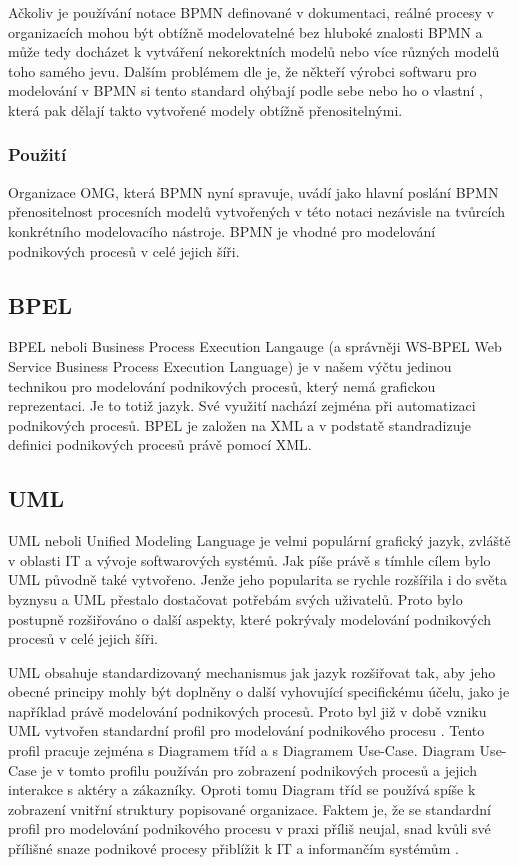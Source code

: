 \documentclass[]{article}
\begin{document}
Ačkoliv je používání notace BPMN definované v dokumentaci, reálné procesy v organizacích mohou být obtížně modelovatelné bez hluboké znalosti BPMN a může tedy docházet k vytváření nekorektních modelů nebo více různých modelů toho samého jevu. Dalším problémem dle \cite{Polancic2014} je, že někteří výrobci softwaru pro modelování v BPMN si tento standard ohýbají podle sebe nebo ho  o vlastní , která pak dělají takto vytvořené modely obtížně přenositelnými.

\subsubsection{Použití}
Organizace OMG, která BPMN nyní spravuje, uvádí jako hlavní poslání BPMN přenositelnost procesních modelů vytvořených v této notaci nezávisle na tvůrcích konkrétního modelovacího nástroje. BPMN je vhodné pro modelování podnikových procesů v celé jejich šíři.

\subsection{BPEL}
BPEL neboli Business Process Execution Langauge (a správněji WS-BPEL Web Service Business Process Execution Language) je v našem výčtu jedinou technikou pro modelování podnikových procesů, který nemá grafickou reprezentaci. Je to totiž jazyk. Své využití nachází zejména při automatizaci podnikových procesů. BPEL je založen na XML a v podstatě standradizuje definici podnikových procesů právě pomocí XML. \cite{BPELcz}

\subsection{UML}
UML neboli Unified Modeling Language je velmi populární grafický jazyk, zvláště v oblasti IT a vývoje softwarových systémů. Jak píše \cite{Eriksson} právě s tímhle cílem bylo UML původně také vytvořeno. Jenže jeho popularita se rychle rozšířila i do světa byznysu a UML přestalo dostačovat potřebám svých uživatelů. Proto bylo postupně rozšiřováno o další aspekty, které pokrývaly modelování podnikových procesů v celé jejich šíři.

UML obsahuje standardizovaný mechanismus jak jazyk rozšiřovat tak, aby jeho obecné principy mohly být doplněny o další vyhovující specifickému účelu, jako je například právě modelování podnikových procesů. Proto byl již v době vzniku UML vytvořen standardní profil pro modelování podnikového procesu \cite{Repa2007}. Tento profil pracuje zejména s Diagramem tříd a s Diagramem Use-Case. Diagram Use-Case je v tomto profilu používán pro zobrazení podnikových procesů a jejich interakce s aktéry a zákazníky. Oproti tomu Diagram tříd se používá spíše k zobrazení vnitřní struktury popisované organizace. Faktem je, že se standardní profil pro modelování podnikového procesu v praxi příliš neujal, snad kvůli své přílišné snaze podnikové procesy přiblížit k IT a informančím systémům \cite{Repa2007}.
\end{document}
